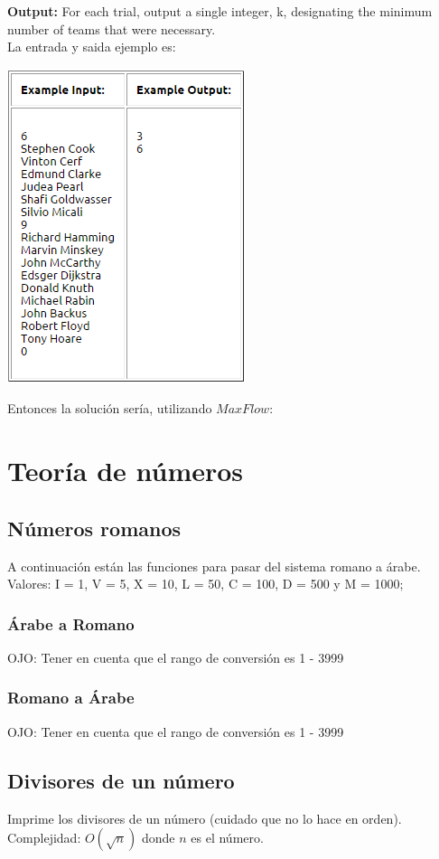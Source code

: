 \documentclass[10pt,letterpaper,twocolumn]{article}
\newcommand{\source}[1]{
	
	\dotfill
}
\begin{document}
\textbf{Output:}  For each trial, output a single integer, k, designating the minimum number of teams that were necessary.\\
\newline
La entrada y saida ejemplo es:\\
	\begin{center}
	\includegraphics{./src/konigSample.png}
	\end{center}
Entonces la solución sería, utilizando $MaxFlow$:\\
	\source{src/konigSampleCode.cpp}
\section{Teoría de números}
	\subsection{Números romanos}
		A continuación están las funciones para pasar del sistema romano a árabe.\\
		Valores: I = 1, V = 5, X = 10, L = 50, C = 100, D = 500 y M = 1000;
		\subsubsection{Árabe a Romano}
			OJO: Tener en cuenta que el rango de conversión es 1 - 3999
			\source{src/arabicToRoman.cpp}
		\subsubsection{Romano a Árabe}
			OJO: Tener en cuenta que el rango de conversión es 1 - 3999
			\source{src/romanToArabic.cpp}
		\subsection{Divisores de un número}
			Imprime los divisores de un número (cuidado que no lo hace en orden).\\
			Complejidad: $O(\sqrt{n})$ donde $n$ es el número.\\
			\source{./src/divisors.cpp}
\end{document}
